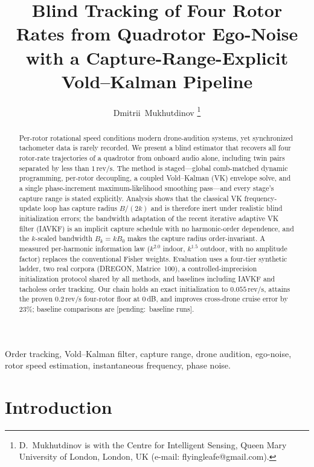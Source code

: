 \documentclass[journal]{IEEEtran}
\newcommand{\revps}{\ensuremath{\,\mathrm{rev/s}}}
\newcommand{\pending}[1]{{\color{gray}\textsf{[pending:~#1]}}}
\begin{document}
\title{Blind Tracking of Four Rotor Rates from Quadrotor Ego-Noise with a
  Capture-Range-Explicit Vold--Kalman Pipeline}

\author{Dmitrii~Mukhutdinov%
  \thanks{D.~Mukhutdinov is with the Centre for Intelligent Sensing, Queen
    Mary University of London, London, UK (e-mail: flyingleafe@gmail.com).}}

\maketitle

\begin{abstract}
Per-rotor rotational speed conditions modern drone-audition systems, yet
synchronized tachometer data is rarely recorded. We present a blind
estimator that recovers all four rotor-rate trajectories of a quadrotor
from onboard audio alone, including twin pairs separated by less than
$1\revps$. The method is staged---global comb-matched dynamic programming,
per-rotor decoupling, a coupled Vold--Kalman (VK) envelope solve, and a
single phase-increment maximum-likelihood smoothing pass---and every
stage's capture range is stated explicitly. Analysis shows that the
classical VK frequency-update loop has capture radius $B/(2k)$ and is
therefore inert under realistic blind initialization errors; the bandwidth
adaptation of the recent iterative adaptive VK filter (IAVKF) is an
implicit capture schedule with no harmonic-order dependence, and the
$k$-scaled bandwidth $B_k = kB_0$ makes the capture radius
order-invariant. A measured per-harmonic information law
($k^{2.0}$ indoor, $k^{1.5}$ outdoor, with no amplitude factor) replaces
the conventional Fisher weights. Evaluation uses a four-tier synthetic
ladder, two real corpora (DREGON, Matrice~100), a controlled-imprecision
initialization protocol shared by all methods, and baselines including
IAVKF and tacholess order tracking. Our chain holds an exact
initialization to $0.055\revps$, attains the proven $0.2\revps$ four-rotor
floor at 0\,dB, and improves cross-drone cruise error by 23\%; baseline
comparisons are \pending{baseline runs}.
\end{abstract}

\begin{IEEEkeywords}
Order tracking, Vold--Kalman filter, capture range, drone audition,
ego-noise, rotor speed estimation, instantaneous frequency, phase noise.
\end{IEEEkeywords}

\section{Introduction}
\label{sec:intro}
\end{document}
